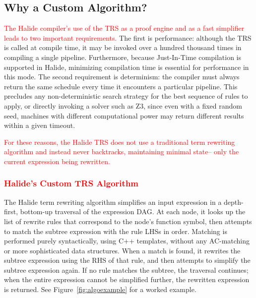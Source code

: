 \documentclass[acmsmall,review]{acmart}\settopmatter{printfolios=true,printccs=false,printacmref=false}
\newcommand{\modified}[1]{\textcolor{red}{{#1}}}
\begin{document}

\subsection{Why a Custom Algorithm?}

\modified{The Halide compiler's use of the TRS as a proof engine and as a fast simplifier
leads to two important requirements.}  
The first is performance: although the TRS is called at
compile time, it may be invoked over a hundred thousand times in compiling a single pipeline. 
Furthermore, because Just-In-Time compilation is supported in Halide,
minimizing compilation time is essential for performance in this mode.
The second requirement is determinism: the compiler must
always return the same schedule every time it encounters a particular pipeline.
This precludes any non-deterministic search strategy for the best sequence of
rules to apply, or directly invoking a solver such as Z3, since even with a
fixed random seed, machines with different computational power may return
different results within a given timeout.

\modified{For these reasons, the Halide TRS does not use a traditional term rewriting
algorithm and instead never backtracks, maintaining minimal state-- only the
current expression being rewritten.}

\subsubsection{\modified{Halide's Custom TRS Algorithm}}
\label{sec:customalgo}
The Halide term rewriting algorithm simplifies an input expression in a
depth-first, bottom-up traversal of the expression DAG. At each node, it looks
up the list of rewrite rules that correspond to the node's function symbol, then
attempts to match the subtree expression with the rule LHSs in order. Matching
is performed purely syntactically, using C++ templates, without any AC-matching
or more sophisticated data structures. When a match is found, it rewrites the
subtree expression using the RHS of that rule, and then attempts to simplify the
subtree expression again. If no rule matches the subtree, the traversal
continues; when the entire expression cannot be simplified further, the
rewritten expression is returned. See Figure~\ref{fig:algoexample} for a worked
example.
\end{document}
